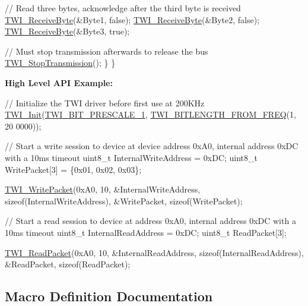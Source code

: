\begin{DoxyCode}
        \textcolor{comment}{// Read three bytes, acknowledge after the third byte is received}
        \hyperlink{group__Group__TWI__AVR8_ga551074dff05c93c7317440b55278aa1b}{TWI\_ReceiveByte}(&Byte1, \textcolor{keyword}{false});
        \hyperlink{group__Group__TWI__AVR8_ga551074dff05c93c7317440b55278aa1b}{TWI\_ReceiveByte}(&Byte2, \textcolor{keyword}{false});
        \hyperlink{group__Group__TWI__AVR8_ga551074dff05c93c7317440b55278aa1b}{TWI\_ReceiveByte}(&Byte3, \textcolor{keyword}{true});

        \textcolor{comment}{// Must stop transmission afterwards to release the bus}
        \hyperlink{TWI__AVR8_8c_a053f3f8c0c05407d204375de911dcbbb}{TWI\_StopTransmission}();
    \}
\}
\end{DoxyCode}


{\bfseries High Level A\+PI Example\+:} 
\begin{DoxyCode}
\textcolor{comment}{// Initialize the TWI driver before first use at 200KHz}
\hyperlink{TWI__AVR8_8c_a08e1eb463ce4ec168f2c1cb9b4039cae}{TWI\_Init}(\hyperlink{group__Group__TWI__AVR8_ga66bdf320ad96921bf13c90352bdd5a9a}{TWI\_BIT\_PRESCALE\_1}, \hyperlink{group__Group__TWI__AVR8_ga4761abd051f4daf7da07f886bf6df770}{TWI\_BITLENGTH\_FROM\_FREQ}(1, 20
      0000));

\textcolor{comment}{// Start a write session to device at device address 0xA0, internal address 0xDC with a 10ms timeout}
uint8\_t InternalWriteAddress = 0xDC;
uint8\_t WritePacket[3] = \{0x01, 0x02, 0x03\};

\hyperlink{group__Group__TWI__AVR8_ga7a9c708e4d9fbe6ed807f582bcbded0e}{TWI\_WritePacket}(0xA0, 10, &InternalWriteAddress, \textcolor{keyword}{sizeof}(InternalWriteAddress),
                &WritePacket, \textcolor{keyword}{sizeof}(WritePacket);

\textcolor{comment}{// Start a read session to device at address 0xA0, internal address 0xDC with a 10ms timeout}
uint8\_t InternalReadAddress = 0xDC;
uint8\_t ReadPacket[3];

\hyperlink{group__Group__TWI__AVR8_gaea02d723a16ed7f11d485c24175d8117}{TWI\_ReadPacket}(0xA0, 10, &InternalReadAddress, \textcolor{keyword}{sizeof}(InternalReadAddress),
               &ReadPacket, \textcolor{keyword}{sizeof}(ReadPacket);
\end{DoxyCode}
 

\subsection{Macro Definition Documentation}
\mbox{\label{group__Group__TWI__AVR8_gaed9e1e1d80a4dd73f43f91ebee131031}} 
